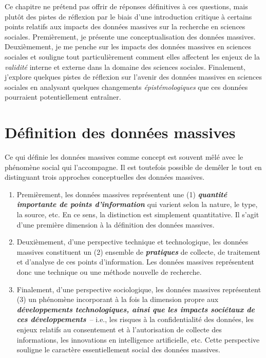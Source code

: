 \documentclass[
  letterpaper,
]{scrbook}
\begin{document}
Ce chapitre ne prétend pas offrir de réponses définitives à ces
questions, mais plutôt des pistes de réflexion par le biais d'une
introduction critique à certains points relatifs aux impacts des données
massives sur la recherche en sciences sociales. Premièrement, je
présente une conceptualisation des données massives. Deuxièmement, je me
penche sur les impacts des données massives en sciences sociales et
souligne tout particulièrement comment elles affectent les enjeux de la
\emph{validité} interne et externe dans la domaine des sciences
sociales. Finalement, j'explore quelques pistes de réflexion sur
l'avenir des données massives en sciences sociales en analysant quelques
changements \emph{épistémologiques} que ces données pourraient
potentiellement entraîner.

\hypertarget{duxe9finition-des-donnuxe9es-massives}{%
\section{Définition des données
massives}\label{duxe9finition-des-donnuxe9es-massives}}

Ce qui définie les données massives comme concept est souvent mêlé avec
le phénomène social qui l'accompagne. Il est toutefois possible de
demêler le tout en distinguant trois approches conceptuelles des données
massives.

\begin{enumerate}
\def\labelenumi{\arabic{enumi}.}
\item
  Premièrement, les données massives représentent une (1)
  \textbf{\emph{quantité importante de points d'information}} qui
  varient selon la nature, le type, la source, etc. En ce sens, la
  distinction est simplement quantitative. Il s'agit d'une première
  dimension à la définition des données massives.
\item
  Deuxièmement, d'une perspective technique et technologique, les
  données massives constituent un (2) ensemble de
  \textbf{\emph{pratiques}} de collecte, de traitement et d'analyse de
  ces points d'information. Les données massives représentent donc une
  technique ou une méthode nouvelle de recherche.
\item
  Finalement, d'une perspective sociologique, les données massives
  représentent (3) un phénomène incorporant à la fois la dimension
  propre aux \textbf{\emph{développements technologiques, ainsi que les
  impacts sociétaux de ces développements}}~-- i.e., les risques à la
  confidentialité des données, les enjeux relatifs au consentement et à
  l'autorisation de collecte des informations, les innovations en
  intelligence artificielle, etc. Cette perspective souligne le
  caractère essentiellement social des données massives.
\end{enumerate}
\end{document}
